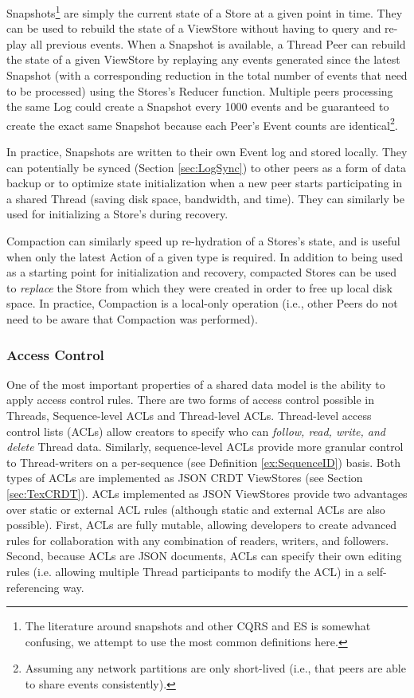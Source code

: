 \documentclass{textile}
\begin{document}
Snapshots\footnote{The literature around snapshots and other CQRS and ES is somewhat confusing, we attempt to use the most common definitions here.} are simply the current state of a Store at a given point in time. They can be used to rebuild the state of a ViewStore without having to query and re-play all previous events. When a Snapshot is available, a Thread Peer can rebuild the state of a given ViewStore by replaying any events generated since the latest Snapshot (with a corresponding reduction in the total number of events that need to be processed) using the Stores's Reducer function. Multiple peers processing the same Log could create a Snapshot every 1000 events and be guaranteed to create the exact same Snapshot because each Peer's Event counts are identical\footnote{Assuming any network partitions are only short-lived (i.e., that peers are able to share events consistently).}. 

In practice, Snapshots are written to their own Event log and stored locally. They can potentially be synced (Section \ref{sec:LogSync}) to other peers as a form of data backup or to optimize state initialization when a new peer starts participating in a shared Thread (saving disk space, bandwidth, and time). They can similarly be used for initializing a Store's during recovery.

Compaction can similarly speed up re-hydration of a Stores's state, and is useful when only the latest Action of a given type is required. In addition to being used as a starting point for initialization and recovery, compacted Stores can be used to \emph{replace} the Store from which they were created in order to free up local disk space. In practice, Compaction is a local-only operation (i.e., other Peers do not need to be aware that Compaction was performed).

\subsubsection{Access Control} \label{sec:AccessControl}

One of the most important properties of a shared data model is the ability to apply access control rules. There are two forms of access control possible in Threads, Sequence-level ACLs and Thread-level ACLs. Thread-level access control lists (ACLs) allow creators to specify who can \emph{follow, read, write, and delete} Thread data. Similarly, sequence-level ACLs provide more granular control to Thread-writers on a per-sequence (see Definition \ref{ex:SequenceID}) basis. Both types of ACLs are implemented as JSON CRDT ViewStores (see Section \ref{sec:TexCRDT}). ACLs implemented as JSON ViewStores provide two advantages over static or external ACL rules (although static and external ACLs are also possible). First, ACLs are fully mutable, allowing developers to create advanced rules for collaboration with any combination of readers, writers, and followers. Second, because ACLs are JSON documents, ACLs can specify their own editing rules (i.e. allowing multiple Thread participants to modify the ACL) in a self-referencing way.
\end{document}
